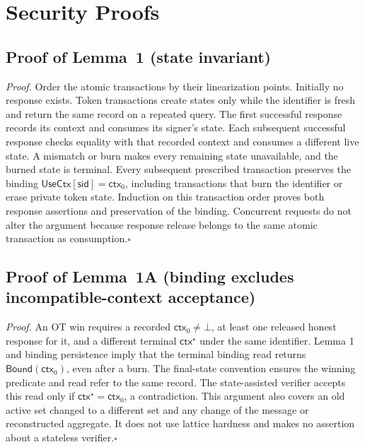 \documentclass[lettersize,journal]{IEEEtran}
\begin{document}
\section{Security Proofs}

\subsection{Proof of Lemma~1 (state invariant)}
\label{app:proof-state-invariant}

\emph{Proof.}
Order the atomic transactions by their linearization points. Initially no
response exists. Token transactions create states only while the identifier
is fresh and return the same record on a repeated query. The first
successful response records its context and consumes its signer's state.
Each subsequent successful response checks equality with that recorded
context and consumes a different live state. A mismatch or burn makes every
remaining state unavailable, and the burned state is terminal. Every subsequent
prescribed transaction preserves the binding
$\mathsf{UseCtx}[\mathsf{sid}]=\mathsf{ctx}_0$, including transactions
that burn the identifier or erase private token state.
Induction on this transaction order proves both response assertions
and preservation of the binding. Concurrent requests do not
alter the argument because response release belongs to the same atomic
transaction as consumption.\hfill$\square$

\subsection{Proof of Lemma~1A (binding excludes incompatible-context acceptance)}
\label{app:proof-context-binding}

\emph{Proof.}
An OT win requires a recorded $\mathsf{ctx}_0\ne\bot$, at least one released
honest response for it, and a different terminal $\mathsf{ctx}^{\star}$
under the same identifier. Lemma 1 and binding persistence imply that the
terminal binding read returns $\mathsf{Bound}(\mathsf{ctx}_0)$, even after
a burn. The final-state convention ensures the winning predicate and read
refer to the same record. The state-assisted verifier accepts this read only if
$\mathsf{ctx}^{\star}=\mathsf{ctx}_0$, a contradiction. This argument also
covers an old active set changed to a different set and any change of the
message or reconstructed aggregate. It does not use lattice hardness and
makes no assertion about a stateless verifier.\hfill$\square$
\end{document}

